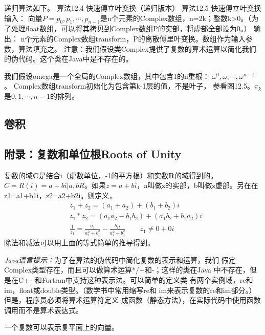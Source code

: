 递归算法如下。
算法12.4 快速傅立叶变换（递归版本）
算法12.5 快速傅立叶变换
输入： 向量$P=p_0, p_1, \cdots, p_{n-1}$是n个元素的Complex数组，n=2k；整数k>0。（为了处理float数组，可以将其拷贝到Complex数组P的实部，将虚部全部设为0。）
输出： n个元素的Complex数组transform，P的离散傅里叶变换。数组作为输入参数，算法填充之。
注意：我们假设类Complex提供了复数的算术运算以简化我们的伪代码。这个类在Java中是不存在的。

我们假设omega是一个全局的Complex数组，其中包含1的n重根：
$\omega^0, \omega, \cdots, \omega^{n-1}$。
Complex数组transform初始化为包含第k-1层的值，不是叶子，
参看图12.5。$\pi_k$是${0, 1, \cdots, n-1}$的排列。

\subsection{卷积}
\subsection{附录：复数和单位根Roots of Unity}
复数的域\textbf{C}是结合i（虚数单位，-1的平方根）和实数\textbf{R}的域得到的。
$C=R(i)={a+bi| a,b R}$。如果$z=a+bi$，a叫做z的实部，b叫做z虚部。另在在z1=a1+b1i，z2=a2+b2i。则定义，
\begin{displaymath}
\begin{aligned}
&z_1+z_2=(a_1+a_2)+(b_1+b_2)i\\
&z_1*z_2=(a_1a_2-b_1b_2)+(a_1b_2+b_1a_2)i\\
&\frac{1}{z_1}=\frac{a_1}{a_1^2+b_1^2}-\frac{b_1i}{a_1^2+b_1^2} \qquad z_1 \neq  0+0i
\end{aligned}
\end{displaymath}
除法和减法可以用上面的等式简单的推导得到。

\emph{Java语言提示：}为了在算法的伪代码中简化复数的表示和运算，我们
假定Complex类型存在，而且可以做算术运算*/+和-；这样的类在Java
中不存在，但是在C++和Fortran中支持这种表示法。可以简单的定义类
有两个实例域，re和im，float或double类型。（数学书中常用缩写re和
im来表示复数的re和im部分。）但是，程序员必须将算术运算符定义
成函数（静态方法），在实际代码中使用函数调用而不是算术表达式。

一个复数可以表示复平面上的向量。
